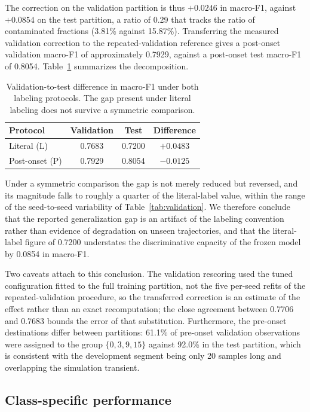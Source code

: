 \documentclass[12pt,a4paper]{article}
\begin{document}
The correction on the validation partition is thus $+0.0246$ in macro-F1,
against $+0.0854$ on the test partition, a ratio of 0.29 that tracks the ratio
of contaminated fractions (3.81\% against 15.87\%). Transferring the measured
validation correction to the repeated-validation reference gives a post-onset
validation macro-F1 of approximately 0.7929, against a post-onset test macro-F1
of 0.8054. Table~\ref{tab:gap} summarizes the decomposition.

\begin{table}[H]
\centering
\caption{Validation-to-test difference in macro-F1 under both labeling
protocols. The gap present under literal labeling does not survive a symmetric
comparison.}
\label{tab:gap}
\small
\begin{tabular}{lccc}
\toprule
Protocol & Validation & Test & Difference\\
\midrule
Literal (L)    & 0.7683 & 0.7200 & $+0.0483$\\
Post-onset (P) & 0.7929 & 0.8054 & $-0.0125$\\
\bottomrule
\end{tabular}
\end{table}

Under a symmetric comparison the gap is not merely reduced but reversed, and
its magnitude falls to roughly a quarter of the literal-label value, within the
range of the seed-to-seed variability of Table~\ref{tab:validation}. We
therefore conclude that the reported generalization gap is an artifact of the
labeling convention rather than evidence of degradation on unseen trajectories,
and that the literal-label figure of 0.7200 understates the discriminative
capacity of the frozen model by 0.0854 in macro-F1.

Two caveats attach to this conclusion. The validation rescoring used the tuned
configuration fitted to the full training partition, not the five per-seed
refits of the repeated-validation procedure, so the transferred correction is
an estimate of the effect rather than an exact recomputation; the close
agreement between 0.7706 and 0.7683 bounds the error of that substitution.
Furthermore, the pre-onset destinations differ between partitions: 61.1\% of
pre-onset validation observations were assigned to the group $\{0,3,9,15\}$
against 92.0\% in the test partition, which is consistent with the development
segment being only 20 samples long and overlapping the simulation transient.

\subsection{Class-specific performance}
\end{document}
